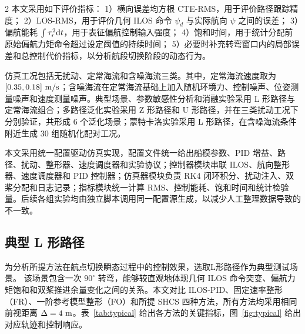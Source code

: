 \documentclass[authordraft]{ctacn}
\begin{document}
\begin{multicols}{2}
本文采用如下评价指标：
1）横向误差均方根 CTE-RMS，用于评价路径跟踪精度；
2）LOS-RMS，用于评价几何 ILOS 命令 $\psi_d$ 与实际航向 $\psi$ 之间的误差；
3）偏航能耗 $\int \tau_r^2{\rm d}t$，用于表征偏航控制输入强度；
4）饱和时间，用于统计分配前原始偏航力矩命令超过设定阈值的持续时间；
5）必要时补充转弯窗口内的局部误差和总控制代价指标，以分析航段切换阶段的动态行为。

仿真工况包括无扰动、定常海流和含噪海流三类。其中，定常海流速度取为 $[0.35,0.18]~{\rm m/s}$；含噪海流在定常海流基础上加入随机环境力、控制噪声、位姿测量噪声和速度测量噪声。典型场景、参数敏感性分析和消融实验采用 L 形路径与定常海流组合；多路径泛化实验采用 Z 形路径和 U 形路径，并在三类扰动工况下分别验证，共形成 6 个泛化场景；蒙特卡洛实验采用 L 形路径，在含噪海流条件附近生成 30 组随机化配对工况。

本文采用统一配置驱动仿真实现，配置文件统一给出船模参数、PID 增益、路径、扰动、整形器、速度调度器和实验协议；控制器模块串联 ILOS、航向整形器、速度调度器和 PID 控制器；仿真器模块负责 RK4 闭环积分、扰动注入、双桨分配和日志记录；指标模块统一计算 RMS、控制能耗、饱和时间和统计检验量。后续各组实验均由独立脚本调用同一配置源生成，以减少人工整理数据导致的不一致。

\subsection{典型 L 形路径}
为分析所提方法在航点切换瞬态过程中的控制效果，选取L形路径作为典型测试场景。
该场景包含一次 $90^\circ$ 转弯，能够较直观地体现几何 ILOS 命令突变、偏航力矩饱和和双桨推进余量变化之间的关系。本文对比 ILOS-PID、固定速率整形（FR）、一阶参考模型整形（FO）和所提 SHCS 四种方法，所有方法均采用相同前视距离 $\Delta=4~{\rm m}$。表~\ref{tab:typical} 给出各方法的关键指标，图~\ref{fig:typical} 给出对应轨迹和控制响应。


\end{multicols}
\end{document}
